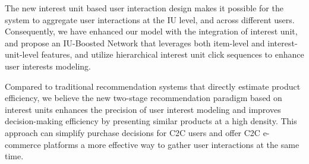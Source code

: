 The new interest unit based user interaction design makes it possible for the system to aggregate user interactions at the IU level, and across different users. Consequently, we have enhanced our model with the integration of interest unit, and propose an IU-Boosted Network that leverages both item-level and interest-unit-level features, and utilize hierarchical interest unit click sequences to enhance user interests modeling. 



Compared to traditional recommendation systems that directly estimate product efficiency, we believe the new two-stage recommendation paradigm based on interest units enhances the precision of user interest modeling and improves decision-making efficiency by presenting similar products at a high density. This approach can simplify purchase decisions for C2C users and offer C2C e-commerce platforms a more effective way to gather user interactions at the  same time.




